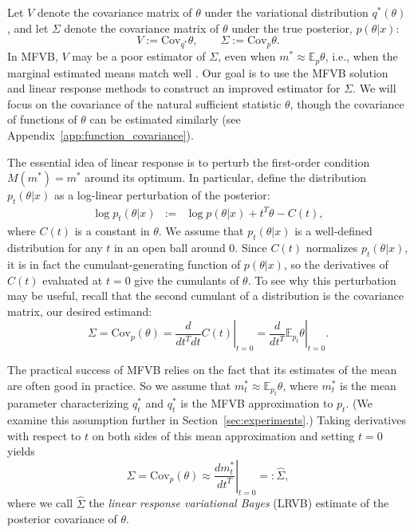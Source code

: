 \documentclass{article}\usepackage[]{graphicx}\usepackage[]{color}
\newcommand{\app}[1]{Appendix~\ref{app:#1}}
\newcommand{\mysec}[1]{Section~\ref{sec:#1}}
\newcommand{\mpq}{m} %
\newcommand{\mpopt}{m^*} %
\newcommand{\truecov}{\Sigma} %
\newcommand{\lrcov}{\hat{\Sigma}} %
\newcommand{\vbcov}{V} %
\newcommand{\constant}{C} %
\newcommand{\mbe}{\mathbb{E}}
\newcommand{\cov}{\textrm{Cov}}
\begin{document}
Let $\vbcov$ denote the covariance matrix of $\theta$ under
the variational distribution $q^{*}(\theta)$, and let $\truecov$ denote the
covariance matrix of $\theta$ under the true posterior,
%
$p(\theta | x)$:
$$
\vbcov := \cov_{q^{*}} \theta,
\quad \quad
\truecov := \cov_{p} \theta.
$$
%
In MFVB, $\vbcov$ may be a poor estimator of $\truecov$, even when $\mpopt
\approx \mbe_{p} \theta$, i.e., when the marginal estimated means match well
\citep{wang:2005:inadequacy, bishop:2006:pattern, turner:2011:two}. Our goal is
to use the MFVB solution and linear response methods to construct an improved
estimator for $\truecov$.  We will focus on the covariance of the natural
sufficient statistic $\theta$, though the covariance of functions of $\theta$
can be estimated similarly (see \app{function_covariance}).

The essential idea of linear response is to perturb the first-order condition
$M(\mpopt) = \mpopt$ around its optimum. In particular, define the distribution
$p_{t}\left(\theta\vert x\right)$ as a log-linear perturbation of the posterior:
%
\begin{eqnarray} \label{eq:perturbed_dens}
\log p_{t}\left(\theta\vert x \right) & := &
    \log p\left(\theta\vert x \right) + t^{T}\theta - \constant\left( t\right),
\end{eqnarray}
%
where $\constant\left( t\right)$ is a constant in $\theta$. We assume that $p_t
(\theta \vert x)$ is a well-defined distribution for any $t$ in an open ball
around 0. Since $\constant\left( t\right)$ normalizes $p_t(\theta \vert x)$, it
is in fact the cumulant-generating function of $p(\theta \vert x)$, so the
derivatives of $\constant\left( t\right)$ evaluated at $t=0$ give the cumulants
of $\theta$. To see why this perturbation may be useful, recall that the second
cumulant of a distribution is the covariance matrix, our desired estimand:
%
$$
  \truecov = \cov_{p}(\theta) = \left. \frac{d}{dt^T dt} C(t) \right|_{t=0} = \left. \frac{d}{dt^T} \mbe_{p_t} \theta \right|_{t=0}.
$$

The practical success of MFVB relies on the fact that its estimates of the mean
are often good in practice. So we assume that $\mpopt_t \approx \mbe_{p_t}
\theta$, where $\mpopt_t$ is the mean parameter characterizing $q_t^*$ and
$q_t^*$ is the MFVB approximation to $p_t$. (We examine this assumption further
in \mysec{experiments}.) Taking derivatives with respect to $t$ on both sides of
this mean approximation and setting $t=0$ yields
%
\begin{equation}\label{eq:lrvb_derivative_defn}
  \truecov = \cov_{p}(\theta) \approx \left. \frac{d\mpq^*_t}{dt^T} \right|_{t=0} =: \lrcov,
\end{equation}
%
where we call $\lrcov$ the \emph{linear response variational Bayes} (LRVB)
estimate of the posterior covariance of $\theta$.
\end{document}
